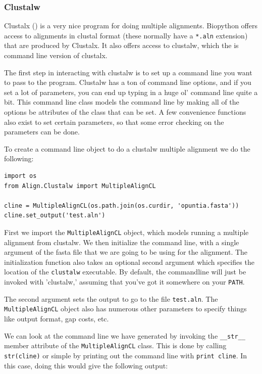 \documentclass{article}
\begin{document}
\subsubsection{Clustalw}
\label{sec:align_clustal}

Clustalx () is a very nice program for doing multiple alignments. Biopython offers access to alignments in clustal format (these normally have a \verb|*.aln| extension) that are produced by Clustalx. It also offers access to clustalw, which the is command line version of clustalx.


The first step in interacting with clustalw is to set up a command line you want to pass to the program. Clustalw has a ton of command line options, and if you set a lot of parameters, you can end up typing in a huge ol' command line quite a bit. This command line class models the command line by making all of the options be attributes of the class that can be set. A few convenience functions also exist to set certain parameters, so that some error checking on the parameters can be done.


To create a command line object to do a clustalw multiple alignment we do the following:

\begin{verbatim}
import os
from Align.Clustalw import MultipleAlignCL

cline = MultipleAlignCL(os.path.join(os.curdir, 'opuntia.fasta'))
cline.set_output('test.aln')
\end{verbatim}

First we import the \verb|MultipleAlignCL| object, which models running a multiple alignment from clustalw. We then initialize the command line, with a single argument of the fasta file that we are going to be using for the alignment. The initialization function also takes an optional second argument which specifies the location of the \verb|clustalw| executable. By default, the commandline will just be invoked with 'clustalw,' assuming that you've got it somewhere on your \verb|PATH|.


The second argument sets the output to go to the file \verb|test.aln|. The \verb|MultipleAlignCL| object also has numerous other parameters to specify things like output format, gap costs, etc. 


We can look at the command line we have generated by invoking the \verb|__str__| member attribute of the \verb|MultipleAlignCL| class. This is done by calling \verb|str(cline)| or simple by printing out the command line with \verb|print cline|. In this case, doing this would give the following output:
\end{document}
